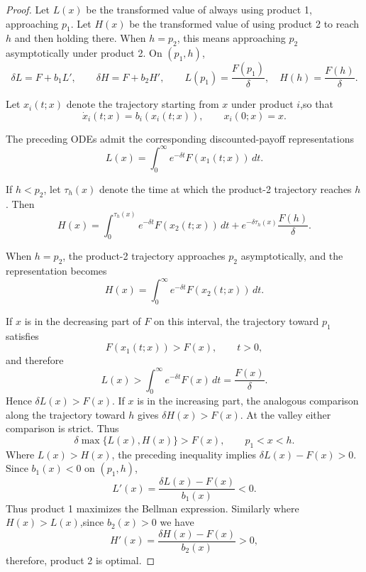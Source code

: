 \documentclass[11pt]{article}
\begin{document}
\begin{proof}
Let $L(x)$ be the transformed value of always using product 1, approaching $p_1$. Let $H(x)$ be the transformed value of using product 2 to reach $h$ and then holding there. When $h=p_2$, this means approaching $p_2$ asymptotically under product 2. On $(p_1,h)$,
\begin{equation*}
\delta L=F+b_1L',\qquad \delta H=F+b_2H',
\qquad
L(p_1)=\frac{F(p_1)}{\delta},\quad
H(h)=\frac{F(h)}{\delta}.
\end{equation*}

Let $x_i(t;x)$ denote the trajectory starting from $x$ under product $i$,so that
\begin{equation*}
       \dot{x}_i(t;x)=b_i(x_i(t;x)),
       \qquad
       x_i(0;x)=x.
\end{equation*}

The preceding ODEs admit the corresponding discounted-payoff
representations
\begin{equation*}
       L(x)=\int_0^\infty e^{-\delta t}F(x_1(t;x))\,dt.
\end{equation*}

If $h<p_2$, let $\tau_h(x)$ denote the time at which the product-2 trajectory reaches $h$. Then
\begin{equation*}
       H(x)=\int_0^{\tau_h(x)}e^{-\delta t}F(x_2(t;x))\,dt+e^{-\delta\tau_h(x)}
\frac{F(h)}{\delta}.
\end{equation*}

When $h=p_2$, the product-2 trajectory approaches $p_2$ asymptotically, and the representation becomes
\begin{equation*}
       H(x)=\int_0^\infty e^{-\delta t}F(x_2(t;x))\,dt.
\end{equation*}

If $x$ is in the decreasing part of $F$ on this interval, the trajectory toward $p_1$ satisfies
\begin{equation*}
       F(x_1(t;x))>F(x),\qquad t>0,
\end{equation*}
and therefore
\begin{equation*}
       L(x)>\int_0^\infty e^{-\delta t}F(x)\,dt=\frac{F(x)}{\delta}.
\end{equation*}
Hence $\delta L(x)>F(x)$. If $x$ is in the increasing part, the analogous
comparison along the trajectory toward $h$ gives $\delta H(x)>F(x)$.
At the valley either comparison is strict. Thus
\begin{equation*}
       \delta\max\{L(x),H(x)\}>F(x),\qquad p_1<x<h.
\end{equation*}
Where $L(x)>H(x)$, the preceding inequality implies $\delta L(x)-F(x)>0$. Since $b_1(x)<0$ on $(p_1,h)$,
\begin{equation*}
       L'(x)=\frac{\delta L(x)-F(x)}{b_1(x)}<0.
\end{equation*}
Thus product 1 maximizes the Bellman expression. Similarly  where $H(x)>L(x)$,since $b_2(x)>0$ we have
\begin{equation*}
       H'(x)=\frac{\delta H(x)-F(x)}{b_2(x)}>0,
\end{equation*}
therefore, product 2 is optimal.


\end{proof}
\end{document}
